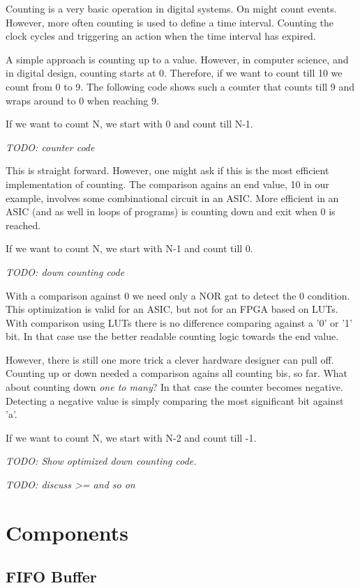 \documentclass[a4paper]{article}
\newcommand{\todo}[1]{{\emph{TODO: #1}}}
\begin{document}
Counting is a very basic operation in digital systems. On might count events.
However, more often counting is used to define a time interval. Counting the
clock cycles and triggering an action when the time interval has expired.

A simple approach is counting up to a value. However, in computer science,
and in digital design, counting starts at 0. Therefore, if we want to count till
10 we count from 0 to 9. The following code shows such a counter that counts
till 9 and wraps around to 0 when reaching 9.

If we want to count N, we start with 0 and count till N-1.

\todo{counter code}



This is straight forward. However, one might ask if this is the most efficient
implementation of counting. The comparison agains an end value, 10 in our
example, involves some combinational circuit in an ASIC. More efficient in an
ASIC (and as well in loops of programs) is counting down and exit when 0
is reached.

If we want to count N, we start with N-1 and count till 0.

\todo{down counting code}

With a comparison against 0 we need only a NOR gat to detect the 0 condition.
This optimization is valid for an ASIC, but not for an FPGA based on LUTs.
With comparison using LUTs there is no difference comparing against a '0' or
'1' bit. In that case use the better readable counting logic towards the end value.

However, there is still one more trick a clever hardware designer can pull off.
Counting up or down needed a comparison agains all counting bis, so far.
What about counting down \emph{one to many}? In that case the counter
becomes negative. Detecting a negative value is simply comparing the
most significant bit against 'a'.

If we want to count N, we start with N-2 and count till -1.

\todo{Show optimized down counting code.}


\todo{discuss >= and so on}

\section{Components}

\subsection{FIFO Buffer}
\end{document}
